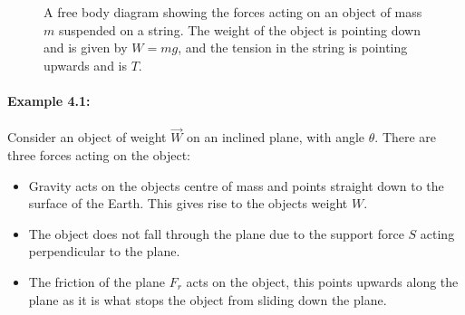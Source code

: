 \documentclass[a4paper,12pt]{book}
\begin{document}
\begin{center}
\begin{figure}[ht]
\def\iangle{35} %
\def\down{-90}
\def\arcr{0.5cm} %
    \caption{A free body diagram showing the forces acting on an object of mass $m$ suspended on a string. The weight of the object is pointing down and is given by $W=mg$, and the tension in the string is pointing upwards and is $T$. }
    \label{fig: free body diagram}
\end{figure}
\end{center}

\paragraph{Example 4.1:} Consider an object of weight $\vec{W}$ on an inclined plane, with angle $\theta$. There are three forces acting on the object:
\begin{itemize}
\setlength{\itemsep}{-5pt}
    \item Gravity acts on the objects centre of mass and points straight down to the surface of the Earth. This gives rise to the objects weight $W$.
    \item The object does not fall through the plane due to the support force $S$ acting perpendicular to the plane.
    \item The friction of the plane $F_{r}$ acts on the object, this points upwards along the plane as it is what stops the object from sliding down the plane.
\end{itemize} 
\end{document}
